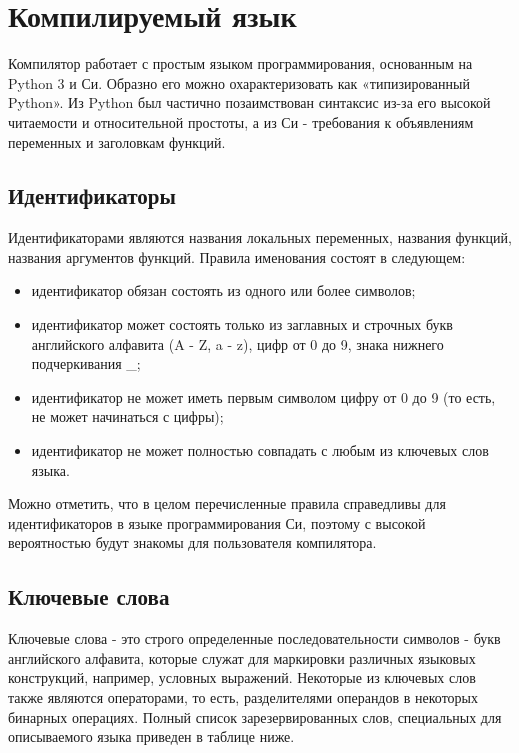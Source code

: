\newpage
\section{Компилируемый язык}

Компилятор работает с простым языком программирования, основанным на Python 3 и Си. Образно его можно охарактеризовать как «типизированный Python». Из Python был частично позаимствован синтаксис из-за его высокой читаемости и относительной простоты, а из Си - требования к объявлениям переменных и заголовкам функций.

\subsection{Идентификаторы}

Идентификаторами являются названия локальных переменных, названия функций, названия аргументов функций. Правила именования состоят в следующем:

\begin{itemize}
    \item идентификатор обязан состоять из одного или более символов;
    \item идентификатор может состоять только из заглавных и строчных букв английского алфавита (A - Z, a - z), цифр от 0 до 9, знака нижнего подчеркивания \_;
    \item идентификатор не может иметь первым символом цифру от 0 до 9 (то есть, не может начинаться с цифры);
    \item идентификатор не может полностью совпадать с любым из ключевых слов языка.

\end{itemize}

Можно отметить, что в целом перечисленные правила справедливы для идентификаторов в языке программирования Си, поэтому с высокой вероятностью будут знакомы для пользователя компилятора.

\subsection{Ключевые слова}

Ключевые слова - это строго определенные последовательности символов - букв английского алфавита, которые служат для маркировки различных языковых конструкций, например, условных выражений. Некоторые из ключевых слов также являются операторами, то есть, разделителями операндов в некоторых бинарных операциях. Полный список зарезервированных слов, специальных для описываемого языка приведен в таблице ниже.

